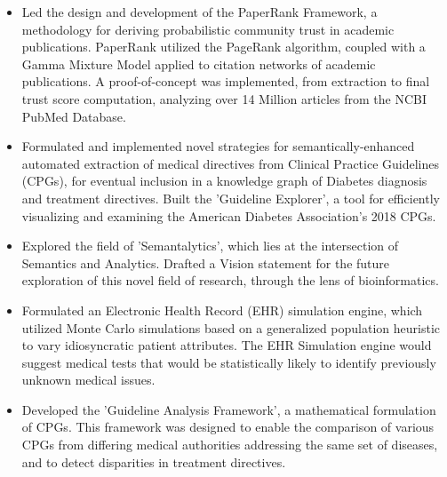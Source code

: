 \documentclass[10pt, letterpaper]{letter}
\begin{document}
        \begin{itemize}[noitemsep, topsep=0pt, parsep=0pt, partopsep=0pt]
            
                \item 
    Led the design and development of the PaperRank Framework, a methodology for deriving probabilistic community trust in academic publications. PaperRank utilized the PageRank algorithm, coupled with a Gamma Mixture Model applied to citation networks of academic publications. A proof-of-concept was implemented, from extraction to final trust score computation, analyzing over 14 Million articles from the NCBI PubMed Database.
            
                \item 
    Formulated and implemented novel strategies for semantically-enhanced automated extraction of medical directives from Clinical Practice Guidelines (CPGs), for eventual inclusion in a knowledge graph of Diabetes diagnosis and treatment directives. Built the 'Guideline Explorer', a tool for efficiently visualizing and examining the American Diabetes Association's 2018 CPGs.
            
                \item 
    Explored the field of 'Semantalytics', which lies at the intersection of Semantics and Analytics. Drafted a Vision statement for the future exploration of this novel field of research, through the lens of bioinformatics.
            
                \item 
    Formulated an Electronic Health Record (EHR) simulation engine, which utilized Monte Carlo simulations based on a generalized population heuristic to vary idiosyncratic patient attributes. The EHR Simulation engine would suggest medical tests that would be statistically likely to identify previously unknown medical issues.
            
                \item 
    Developed the 'Guideline Analysis Framework', a mathematical formulation of CPGs. This framework was designed to enable the comparison of various CPGs from differing medical authorities addressing the same set of diseases, and to detect disparities in treatment directives.
            
        \end{itemize}
    
\end{document}
